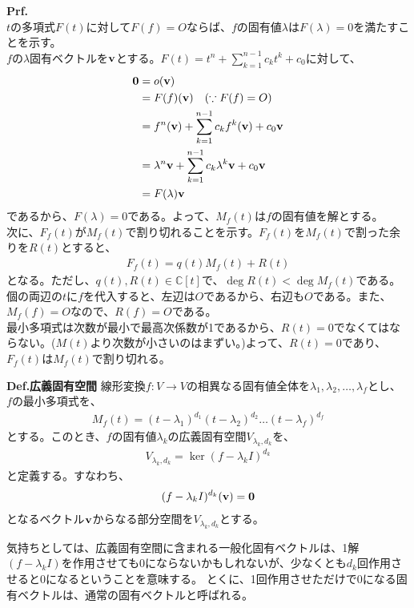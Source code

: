 \documentclass[a4paper,11pt]{jsarticle}
\numberwithin{equation}{section}
\begin{document}
\textbf{Prf.}\\
$t$の多項式$F(t)$に対して$F(f) = O$ならば、$f$の固有値$\lambda$は$F(\lambda) = 0$を満たすことを示す。\\
$f$の$\lambda$固有ベクトルを$\vb{v}$とする。$F(t) = t^n + \sum_{k=1}^{n-1} c_kt^k + c_0$に対して、
\begin{align}
    \vb{0} &= o(\vb{v})\\
    &= F(f)(\vb{v})\quad (\because F(f) = O)\\
    &= f^{n}(\vb{v}) + \sum_{k=1}^{n-1} c_kf^{k}(\vb{v}) + c_0\vb{v}\\
    &= \lambda^{n}\vb{v} + \sum_{k=1}^{n-1} c_k\lambda^{k}\vb{v} + c_0\vb{v}\\
    &= F(\lambda)\vb{v}
\end{align}
であるから、$F(\lambda) = 0$である。よって、$M_f(t)$は$f$の固有値を解とする。\\
次に、$F_f(t)$が$M_f(t)$で割り切れることを示す。$F_f(t)$を$M_f(t)$で割った余りを$R(t)$とすると、
\begin{align}
    F_f(t) = q(t)M_f(t) + R(t)
\end{align}
となる。ただし、$q(t),R(t) \in \mathbb{C}[t]$で、$\deg R(t) < \deg M_f(t)$である。\\
個の両辺の$t$に$f$を代入すると、左辺は$O$であるから、右辺も$O$である。また、$M_f(f) = O$なので、$R(f) = O$である。\\
最小多項式は次数が最小で最高次係数が1であるから、$R(t) = 0$でなくてはならない。($M(t)$より次数が小さいのはまずい。)よって、$R(t) = 0$であり、$F_f(t)$は$M_f(t)$で割り切れる。\hfill\qedsymbol\\

\begin{itembox}[l]{\textbf{Def.広義固有空間}}
  線形変換$f: V \to V$の相異なる固有値全体を$\lambda_1, \lambda_2, \dots, \lambda_f$とし、
  $f$の最小多項式を、
  \begin{align}
      M_f(t) = (t-\lambda_1)^{d_1}(t-\lambda_2)^{d_2}\dots(t-\lambda_f)^{d_f}
  \end{align}
  とする。このとき、$f$の固有値$\lambda_k$の広義固有空間$V_{\lambda_k,d_k}$を、
  \begin{align}
      V_{\lambda_k,d_k} = \ker (f-\lambda_kI)^{d_k}
  \end{align}
  と定義する。すなわち、
  \begin{align}
      (f-\lambda_kI)^{d_k}(\vb{v}) = \vb{0}
  \end{align}
  となるベクトル$\vb{v}$からなる部分空間を$V_{\lambda_k,d_k}$とする。
\end{itembox}
気持ちとしては、広義固有空間に含まれる一般化固有ベクトルは、1解$(f-\lambda_kI)$を作用させても$0$にならないかもしれないが、少なくとも$d_k$回作用させると$0$になるということを意味する。
とくに、1回作用させただけで$0$になる固有ベクトルは、通常の固有ベクトルと呼ばれる。\\
\end{document}
